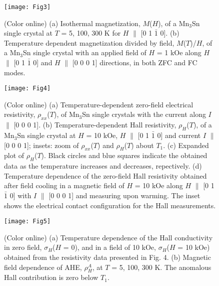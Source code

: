 \documentclass[prb,twocolumn,showpacs,preprintnumbers,amsmath,amssymb]{revtex4}
\begin{document}
\begin{figure}

\centering
\texttt{[image: Fig3]}

\caption{ 
(Color online)
(a) Isothermal magnetization, $M$($H$), of a Mn$_3$Sn single crystal at $T$ = 5, 100, 300 K for $H$ $\parallel$ [0 1 $\bar{1}$ 0]. 
(b) Temperature dependent magnetization divided by field, $M$($T$)/$H$, of a Mn$_3$Sn single crystal with an applied field of $H$ = 1 kOe along $H$ $\parallel$ [0 1 $\bar{1}$ 0] and $H$ $\parallel$ [0 0 0 1] directions, in both ZFC and FC modes.
}\label{fig:fig01(Mn3Sn)}

\end{figure}





\begin{figure}


\centering
\texttt{[image: Fig4]}

\caption{
(Color online)
(a) Temperature-dependent zero-field electrical resistivity, $\rho_{xx}$($T$), of Mn$_3$Sn single crystals with the current along $I$ $\parallel$ [0 0 0 1].
(b) Temperature-dependent Hall resistivity, $\rho_{H}$($T$), of a Mn$_3$Sn single crystal at $H$ = 10 kOe, $H$ $\parallel$ [0 1 $\bar{1}$ 0] and current $I$ $\parallel$ [0 0 0 1];
insets: zoom of $\rho_{xx}$($T$) and $\rho_{H}$($T$) about $T_1$. 
(c) Expanded plot of $\rho_{H}$($T$). 
Black circles and blue squares indicate the obtained data as the temperature increases and decreases, repectively. 
(d) Temperature dependence of the zero-field Hall resistivity obtained after field cooling in a magnetic field of $H$ = 10 kOe along $H$ $\parallel$ [0 1 $\bar{1}$ 0] with $I$ $\parallel$ [0 0 0 1] and measuring upon warming. The inset shows the electrical contact configuration for the Hall measurements.
}\label{fig:fig02(Mn3Sn)}

\end{figure}



\begin{figure}


\centering
\texttt{[image: Fig5]}

\caption{
(Color online)
(a) Temperature dependence of the Hall conductivity in zero field, $\sigma_H$($H$ = 0), and in a field of 10 kOe, $\sigma_H$($H$ = 10 kOe) obtained from the resistivity data presented in Fig. 4.
(b) Magnetic field dependence of AHE, $\rho^{A}_{H}$, at $T$ = 5, 100, 300 K. The anomalous Hall contribution is zero below $T_1$. 
}\label{fig:fig03(Mn3Sn)}

\end{figure}
\end{document}
